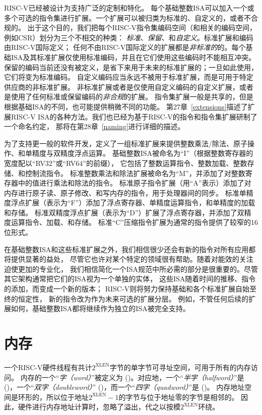 RISC-V已经被设计为支持广泛的定制和特化。
每个基础整数ISA可以加入一个或多个可选的指令集进行扩展。一个扩展可以被归类为标准的、自定义的，或者不合规的。
出于这个目的，我们把每个RISC-V指令集编码空间（和相关的编码空间，例如CSR）划分为三个不相交的种类：
{\em 标准}、{\em 保留}、和{\em 自定义}。标准扩展和编码由RISC-V国际定义；
任何不由RISC-V国际定义的扩展都是{\em 非标准的}的。每个基础ISA及其标准扩展仅使用标准编码，并且在它们使用这些编码时不能相互冲突。
保留的编码当前还没有被定义，是省下来用于未来的标准扩展的；一旦如此使用，它们将变为标准编码。
自定义编码应当永远不被用于标准扩展，而是可用于特定供应商的非标准扩展。
非标准扩展或者是仅使用自定义编码的自定义扩展，或者是使用了任何标准或保留编码的{\em 非合规}的扩展。
指令集扩展一般是共享的，但是根据基础ISA的不同，也可能提供稍微不同的功能。
第27章~\ref{extensions}描述了扩展RISC-V ISA的各种方法。我们也已经为基于RISC-V的指令和指令集扩展研制了一个命名约定，
那将在第28章~\ref{naming}进行详细的描述。


为了支持更一般的软件开发，定义了一组标准扩展来提供整数乘法/除法、原子操作、和单精度与双精度浮点运算。
基础整数ISA被命名为“I”（根据整数寄存器的宽度配以“RV32”或“RV64”的前缀），
它包括了整数运算指令、整数加载、整数存储、和控制流指令。
标准整数乘法和除法扩展被命名为“M”，并添加了对整数寄存器中的值进行乘法和除法的指令。
标准原子指令扩展（用“A”表示）添加了对内存进行原子读、原子修改、和写内存的指令，用于处理器间的同步。
标准单精度浮点扩展（表示为“F”）添加了浮点寄存器、单精度运算指令，和单精度的加载和存储。
标准双精度浮点扩展（表示为“D”）扩展了浮点寄存器，并添加了双精度运算指令、加载、和存储。
标准“C”压缩指令扩展为通常的指令提供了较窄的16位形式。

在基础整数ISA和这些标准扩展之外，我们相信很少还会有新的指令对所有应用都将提供显著的益处，
尽管它也许对某个特定的领域很有帮助。随着对能效的关注迫使更加的专业化，
我们相信简化一个ISA规范中所必需的部分是很重要的。尽管其它架构通常把它们的ISA视为一个单独的实体，
这些ISA随着时间的推移、指令的添加，而变成一个新的版本；
RISC-V则将努力保持基础和各个标准扩展自始至终的恒定性，
新的指令改为作为未来可选的扩展分层。
例如，不管任何后续的扩展如何，基础整数ISA都将继续作为独立的ISA被完全支持。

\section{内存}

一个RISC-V硬件线程有共计$2^{\text{XLEN}}$字节的单字节可寻址空间，可用于所有的内存访问。
内存的一个“{\em 字（word）}”被定义为
()。对应地，一个“{\em 半字（halfword）}”是
()，一个“{\em 双字（doubleword）}”
()，而一个“{\em 四字（quadword）}”是
()。
内存地址空间是环形的，所以位于地址$2^{\text{XLEN}}-1$的字节与位于地址零的字节是相邻的。
因此，硬件进行内存地址计算时，忽略了溢出，代之以按模$2^{\text{XLEN}}$环绕。

